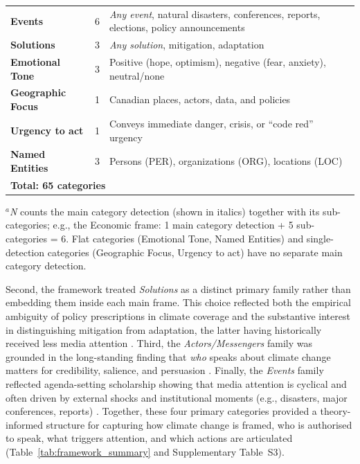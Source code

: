 \documentclass[12pt]{article}
\renewcommand\_{\texttt{\detokenize{_}\allowbreak}}
\begin{document}
\begin{table}[b!]
\begin{tabularx}{\textwidth}{lcX}
\textbf{Events}            & 6 & \textit{Any event}, natural disasters, conferences, reports, elections, policy announcements \\
\textbf{Solutions}         & 3 & \textit{Any solution}, mitigation, adaptation \\
\midrule
\cellcolor{gray!10}\textbf{Emotional Tone} & \cellcolor{gray!10}3 & \cellcolor{gray!10}Positive (hope, optimism), negative (fear, anxiety), neutral/none \\
\midrule
\cellcolor{gray!10}\textbf{Geographic Focus} & \cellcolor{gray!10}1 & \cellcolor{gray!10}Canadian places, actors, data, and policies \\
\midrule
\cellcolor{gray!10}\textbf{Urgency to act} & \cellcolor{gray!10}1 & \cellcolor{gray!10}Conveys immediate danger, crisis, or ``code red'' urgency \\
\midrule
\cellcolor{gray!10}\textbf{Named Entities} & \cellcolor{gray!10}3 & \cellcolor{gray!10}Persons (PER), organizations (ORG), locations (LOC) \\
\midrule
\multicolumn{3}{l}{\cellcolor{gray!25}\textbf{Total: 65 categories}} \\
\bottomrule
\end{tabularx}
\vspace{-0.1em}
{\footnotesize $^a$\emph{N} counts the main category detection (shown in italics) together with its sub-categories; e.g., the Economic frame: 1 main category detection + 5 sub-categories = 6. Flat categories (Emotional Tone, Named Entities) and single-detection categories (Geographic Focus, Urgency to act) have no separate main category detection.}
\end{table}

Second, the framework treated \emph{Solutions} as a distinct primary family rather than embedding them inside each main frame. This choice reflected both the empirical ambiguity of policy prescriptions in climate coverage and the substantive interest in distinguishing mitigation from adaptation, the latter having historically received less media attention \autocite{ford_coverage_2015}. Third, the \emph{Actors/Messengers} family was grounded in the long-standing finding that \emph{who} speaks about climate change matters for credibility, salience, and persuasion \autocite{trumbo_constructing_1996, boykoff_who_2011}. Finally, the \emph{Events} family reflected agenda-setting scholarship showing that media attention is cyclical and often driven by external shocks and institutional moments (e.g., disasters, major conferences, reports) \autocite{downs_up_1972, liu_explaining_2011}. Together, these four primary categories provided a theory-informed structure for capturing how climate change is framed, who is authorised to speak, what triggers attention, and which actions are articulated (Table~\ref{tab:framework_summary} and Supplementary Table~S3).
\end{document}
